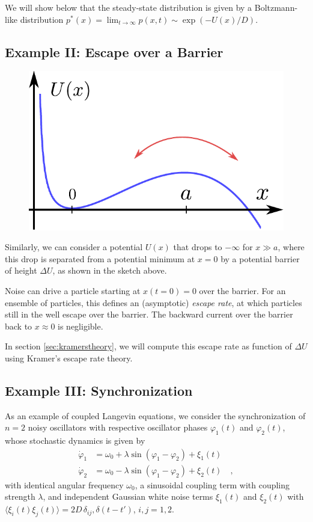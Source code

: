 \documentclass{notebook}
\begin{document}
We will show below that the steady-state distribution is given by a Boltzmann-like distribution $p^\ast(x) = \lim_{t\rightarrow\infty} p(x,t) \sim \exp(-U(x)/D)$. \\

\subsection*{Example II: Escape over a Barrier}

\begin{figure}[H]
	\centering
	\includegraphics[width=0.7\linewidth]{Pics/escape_over_barrier}
	\label{fig:escapeoverbarrier}
\end{figure}
Similarly, we can consider a potential $U(x)$ that drops to $-\infty$ for $x\gg a$,
where this drop is separated from a potential minimum at $x=0$ by a potential barrier of height $\Delta U$,  as shown in the sketch above.

Noise can drive a particle starting at $x(t = 0) = 0$ over the barrier. For an ensemble of particles, this defines an (asymptotic) \textit{escape rate}, at which particles still in the well escape over the barrier. The backward current over the barrier back to $x\approx 0$ is negligible.

In section \ref{sec:kramerstheory}, we will compute this escape rate as function of $\Delta U$ using Kramer's escape rate theory. \\


\subsection*{Example III: Synchronization}

As an example of coupled Langevin equations, 
we consider the synchronization of $n=2$ noisy oscillators
with respective oscillator phases $\varphi_1(t)$ and $\varphi_2(t)$, 
whose stochastic dynamics is given by
\begin{align}
\dot{\varphi}_1 &= \omega_0 + \lambda\sin(\varphi_1-\varphi_2)+\xi_1(t) \\
\dot{\varphi}_2 &= \omega_0 - \lambda\sin(\varphi_1-\varphi_2)+\xi_2(t) \quad,
\end{align}
with identical angular frequency $\omega_0$, 
a sinusoidal coupling term with coupling strength $\lambda$, 
and independent Gaussian white noise terms $\xi_1(t)$ and $\xi_2(t)$ with
$\langle \xi_i(t)\xi_j(t) \rangle = 2D\,\delta_{ij},\delta(t-t')$, $i,j=1,2$.
\end{document}
